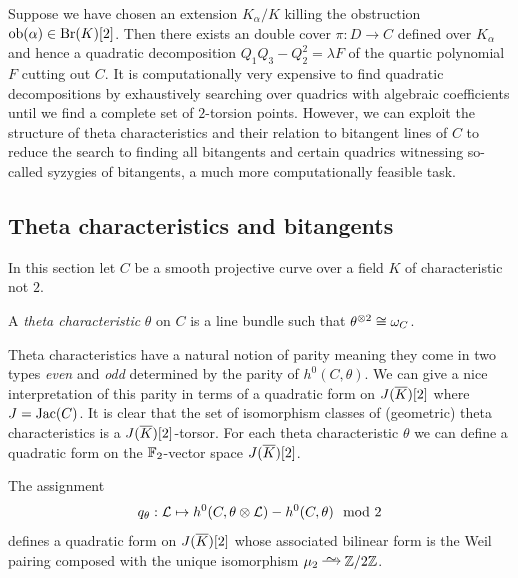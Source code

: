 \documentclass[main.tex]{subfiles}
\begin{document}
\par 
Suppose we have chosen an extension $K_{\alpha} / K$ killing the obstruction $\mathrm{ob}(\alpha) \in \operatorname{\mathrm{Br}}(K)[2]$. Then there exists an \etale double cover $\pi : D \to C$ defined over $K_{\alpha}$ and hence a quadratic decomposition $Q_1 Q_3 - Q_2^2 = \lambda F$ of the quartic polynomial $F$ cutting out $C$. It is computationally very expensive to find quadratic decompositions by exhaustively searching over quadrics with algebraic coefficients until we find a complete set of $2$-torsion points. However, we can exploit the structure of theta characteristics and their relation to bitangent lines of $C$ to reduce the search to finding all bitangents and certain quadrics witnessing so-called syzygies of bitangents, a much more computationally feasible task.


\subsection{Theta characteristics and bitangents}

In this section let $C$ be a smooth projective curve over a field $K$ of characteristic not $2$.

\begin{defn}
A \textit{theta characteristic} $\theta$ on $C$ is a line bundle such that $\theta^{\otimes 2} \cong \omega_C$.
\end{defn}

Theta characteristics have a natural notion of parity meaning they come in two types \textit{even} and \textit{odd} determined by the parity of $h^0(C, \theta)$. We can give a nice interpretation of this parity in terms of a quadratic form on $J(\overline{K})[2]$ where $J = \operatorname{\mathrm{Jac}}(C)$. It is clear that the set of isomorphism classes of (geometric) theta characteristics is a $J(\overline{K})[2]$-torsor.
For each theta characteristic $\theta$ we can define a quadratic form on the $\mathbb{F}_2$-vector space $J(\overline{K})[2]$.

\begin{lemma} \cite[Theorem~1.13]{harris:theta_chars}
The assignment
\[ q_{\theta} : \mathcal{L} \mapsto h^0(C, \theta \otimes \mathcal{L}) - h^0(C, \theta) \mod 2 \]
defines a quadratic form on $J(\overline{K})[2]$ whose associated bilinear form is the Weil pairing composed with the unique isomorphism $\mu_2 \iso \Z / 2 \Z$.
\end{lemma}
\end{document}
